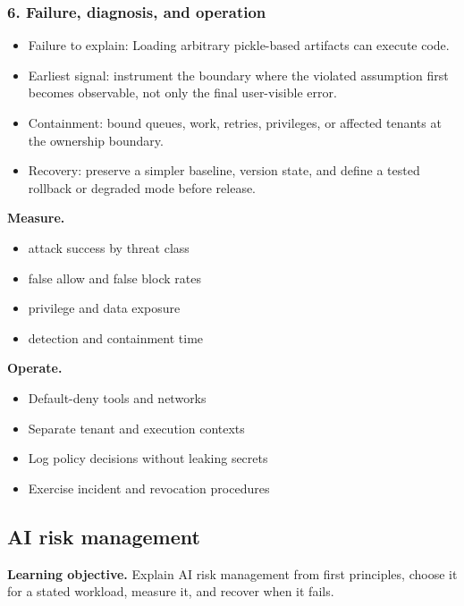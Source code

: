 \subsubsection*{6. Failure, diagnosis, and operation}
\begin{itemize}
\item Failure to explain: Loading arbitrary pickle-based artifacts can execute code.
\item Earliest signal: instrument the boundary where the violated assumption first becomes observable, not only the final user-visible error.
\item Containment: bound queues, work, retries, privileges, or affected tenants at the ownership boundary.
\item Recovery: preserve a simpler baseline, version state, and define a tested rollback or degraded mode before release.
\end{itemize}
\textbf{Measure.}\begin{itemize}
\item attack success by threat class
\item false allow and false block rates
\item privilege and data exposure
\item detection and containment time
\end{itemize}
\textbf{Operate.}\begin{itemize}
\item Default-deny tools and networks
\item Separate tenant and execution contexts
\item Log policy decisions without leaking secrets
\item Exercise incident and revocation procedures
\end{itemize}
\subsection{AI risk management}
\textbf{Learning objective.} Explain AI risk management from first principles, choose it for a stated workload, measure it, and recover when it fails.

